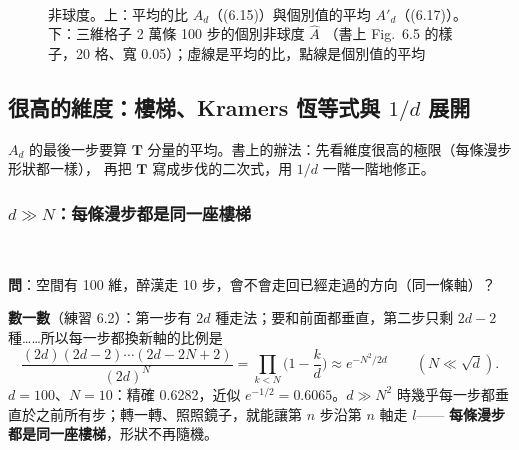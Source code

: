 \begin{figure}[htbp]
\centering
{\small\SixTabA}\\[6pt]
\SixFigHist
\caption{非球度。上：平均的比 $A_d$（(6.15)）與個別值的平均 $A'_d$（(6.17)）。下：三維格子 2 萬條 100 步的個別非球度 $\hat A$
（書上 Fig.~6.5 的樣子，20 格、寬 0.05）；虛線是平均的比，點線是個別值的平均}\label{six-fig-a}
\end{figure}

\subsection{很高的維度：樓梯、Kramers 恆等式與 \texorpdfstring{$1/d$}{1/d} 展開}
\leavevmode{}\quad $A_d$ 的最後一步要算 $\mathbf T$ 分量的平均。書上的辦法：先看維度很高的極限（每條漫步形狀都一樣），
再把 $\mathbf T$ 寫成步伐的二次式，用 $1/d$ 一階一階地修正。

\subsubsection{\texorpdfstring{$d\gg N$}{d >> N}：每條漫步都是同一座樓梯}
\leavevmode{}\ \par\nopagebreak

\textbf{問}：空間有 100 維，醉漢走 10 步，會不會走回已經走過的方向（同一條軸）？

\textbf{數一數}（練習 6.2）：第一步有 $2d$ 種走法；要和前面都垂直，第二步只剩 $2d-2$ 種……所以每一步都換新軸的比例是
\[\frac{(2d)(2d-2)\cdots(2d-2N+2)}{(2d)^N}=\prod_{k<N}\Big(1-\frac kd\Big)\approx e^{-N^2/2d}\qquad(N\ll\sqrt d).\]
$d=100$、$N=10$：精確 0.6282，近似 $e^{-1/2}=0.6065$。$d\gg N^2$ 時幾乎每一步都垂直於之前所有步；轉一轉、照照鏡子，就能讓第 $n$ 步沿第 $n$ 軸走 $l$——
\textbf{每條漫步都是同一座樓梯}，形狀不再隨機。


